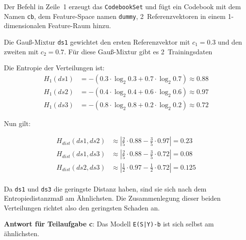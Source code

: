 \documentclass[a5paper,9pt]{scrartcl}
\begin{document}
Der Befehl in Zeile~1 erzeugt das \verb+CodebookSet+ und fügt ein Codebook mit
dem Namen \verb+cb+, dem Feature-Space namen \verb+dummy+, 2~Referenzvektoren
in einem 1-dimensionalen Feature-Raum hinzu.

Die Gauß-Mixtur \verb+ds1+ gewichtet den ersten Referenzvektor mit $c_1 = 0.3$
und den zweiten mit $c_2 = 0.7$. Für diese Gauß-Mixtur gibt es 2~Trainingsdaten

Die Entropie der Verteilungen ist:\nobreak
\begin{align*}
    H_1(ds1) &= -(0.3 \cdot \log_2 0.3 + 0.7 \cdot \log_2 0.7) \approx 0.88\\
    H_1(ds2) &= -(0.4 \cdot \log_2 0.4 + 0.6 \cdot \log_2 0.6) \approx 0.97\\
    H_1(ds3) &= -(0.8 \cdot \log_2 0.8 + 0.2 \cdot \log_2 0.2) \approx 0.72
\end{align*}

Nun gilt:

\begin{align*}
    H_{dist}(ds1, ds2) &\approx |\frac{2}{5} \cdot 0.88 - \frac{3}{5} \cdot 0.97| = 0.23\\
    H_{dist}(ds1, ds3) &\approx |\frac{2}{5} \cdot 0.88 - \frac{3}{5} \cdot 0.72| = 0.08\\
    H_{dist}(ds2, ds3) &\approx |\frac{1}{2} \cdot 0.97 - \frac{1}{2} \cdot 0.72| = 0.125\\
\end{align*}

Da \verb+ds1+ und \verb+ds3+ die geringste Distanz haben, sind sie sich nach
dem Entropiedistanzmaß am Ähnlichsten. Die Zusammenlegung dieser beiden
Verteilungen richtet also den geringsten Schaden an.

\textbf{Antwort für Teilaufgabe c}: Das Modell \verb+E(S|Y)-b+ ist sich selbst
am ähnlichsten.
\end{document}
